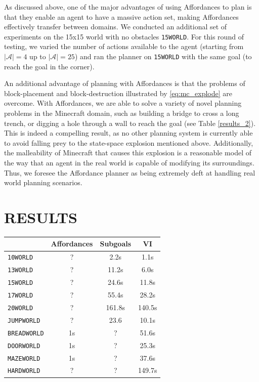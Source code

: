 \documentclass[]{article}
\begin{document}
As discussed above, one of the major advantages of using Affordances 
to plan is that they enable an agent to have a massive action set, 
making Affordances effectively transfer between domains. We 
conducted an additional set of experiments on the 15x15 world 
with no obstacles \texttt{15WORLD}. For this round of testing, we 
varied the number of actions available to the agent (starting from 
$|\mathcal{A}| = 4$ up to $|\mathcal{A}| = 25$) and ran the planner 
on \texttt{15WORLD} with the same goal (to reach the goal in the corner).


An additional advantage of planning with Affordances is that the 
problems of block-placement and block-destruction illustrated by 
\ref{eq:mc_explode} are overcome. With Affordances, we are able 
to solve a variety of novel planning problems in the Minecraft 
domain, such as building a bridge to cross a long trench, or digging 
a hole through a wall to reach the goal (see Table \ref{results_2}). 
This is indeed a compelling result, as no other planning system is 
currently able to avoid falling prey to the state-space explosion 
mentioned above. Additionally, the malleability of Minecraft that 
causes this explosion is a reasonable model of the way that an 
agent in the real world is capable of modifying its surroundings. 
Thus, we foresee the Affordance planner as being extremely deft 
at handling real world planning scenarios.


\section{RESULTS}

\begin{tabular}{ l || c | c | c }
  & Affordances & Subgoals & VI \\
  \hline
  \texttt{10WORLD} & ? & 2.2s & 1.1s  \\
  \texttt{13WORLD} & ? & 11.2s & 6.0s  \\
  \texttt{15WORLD} & ? & 24.6s & 11.8s  \\
  \texttt{17WORLD} & ? & 55.4s & 28.2s  \\
  \texttt{20WORLD} & ? & 161.8s & 140.5s  \\
  \texttt{JUMPWORLD}  & ? & 23.6 & 10.1s \\
  \texttt{BREADWORLD}  & 1s & ? & 51.6s \\
  \texttt{DOORWORLD}  & 1s & ? & 25.3s \\
  \texttt{MAZEWORLD}  & 1s & ? & 37.6s \\
  \texttt{HARDWORLD} & ? & ? & 149.7s
  \label{results_1}
\end{tabular} 
\end{document}

